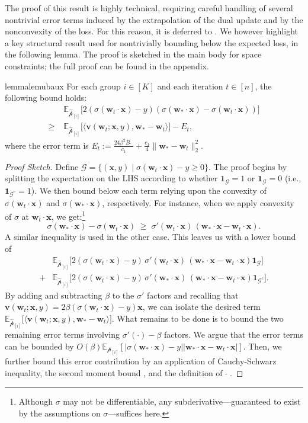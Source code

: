 \documentclass[11pt]{article}
\numberwithin{thm}{section}
\theoremstyle{plain}
\theoremstyle{definition}
\theoremstyle{remark} \newtheorem{remark}[thm]{Remark}
\def\1{\bm{1}}
\def\vv{{\bm{v}}}
\def\vw{{\bm{w}}}
\def\vx{{\bm{x}}}
\def\ep{\widehat{\mathcal{p}}}
\def\pp{{\mathcal{p}}}
\def\cG{{\mathcal{G}}}
\newcommand{\E}{\mathbb{E}}
\newcommand{\ppi}{{\pp_{[i]}}}
\newcommand{\epi}{\ep_{[i]}}
\DeclareMathOperator{\mOPT}{OPT_m}
\newcommand{\mOPThat}{\widehat{\mOPT}}
\begin{document}
The proof of this result is highly technical, requiring careful handling of several nontrivial error terms induced by the extrapolation of the dual update and by the nonconvexity of the loss. For this reason, it is deferred to . We however highlight a key structural result used for nontrivially bounding below the expected loss, in the following lemma. The proof is sketched in the main body for space constraints; the full proof can be found in the appendix. 

\begin{restatable}[Linearization]{lemma}{lemubaux}\label{lemma:main-auxiliary-main-body}
    For each group $i \in [K]$ and each iteration $t \in [n]$, the following bound holds:
    \begin{align*}
        \;&\E_{\epi}\bigl[2(\sigma(\vw_t\cdot \vx)-y)(\sigma(\vw_*\cdot \vx)-\sigma(\vw_t\cdot \vx))\bigr] \\
        \ge\;& \E_{\epi}\bigl[\langle\vv(\vw_t;\vx,y), \vw_*-\vw_t\rangle\bigr] - E_t,
    \end{align*}
    where the error term is $E_t := \frac{24\beta^2 B\mOPThat}{c_1}+\frac{c_1}{4}\|\vw_*-\vw_t\|_2^2$.
\end{restatable}
\begin{proof}[Proof Sketch] 
Define \(\cG = \{(\vx,y)\mid \sigma(\vw_t\cdot \vx)-y\ge0\}\). 
The proof begins by splitting the expectation on the LHS according to whether $\1_{\cG} = 1$ or $\1_{\cG} =0$ (i.e., $\1_{\cG^c} = 1$).
We then bound below each term relying upon  the convexity of \(\sigma(\vw_t\cdot \vx)\) and \(\sigma(\vw_*\cdot \vx)\), respectively.
For instance, when we apply convexity of $\sigma$ at $\vw_t\cdot\vx$, we get:\footnote{Although $\sigma$ may not be differentiable, any subderivative---guaranteed to exist by the assumptions on $\sigma$---suffices here.}
	\[
	\sigma(\vw_*\!\cdot\vx)-\sigma(\vw_t\!\cdot\vx)
	\;\ge\;
	\sigma'(\vw_t\!\cdot\vx)\,(\vw_*\!\cdot\vx-\vw_t\!\cdot\vx).
	\]
A similar inequality is used in the other case.
This leaves us with a lower bound of 
\begin{align*}
&\E_{\epi}\bigl[2(\sigma(\vw_t\!\cdot\vx)-y)\,\sigma'(\vw_t\!\cdot\vx)\,(\vw_*\!\cdot\vx-\vw_t\!\cdot\vx)\1_{\cG}\bigr]\\
		+
		&\E_{\epi}\bigl[2(\sigma(\vw_t\!\cdot\vx)-y)\,\sigma'(\vw_*\!\cdot\vx)\,(\vw_*\!\cdot\vx-\vw_t\!\cdot\vx)\1_{\cG^c}\bigr]. 
\end{align*}
By adding and subtracting \(\beta\) to the $\sigma'$ factors and recalling that $\vv(\vw_t;\vx,y)=2\beta(\sigma(\vw_t\!\cdot\vx)-y)\vx$, 
we can isolate the desired term $\E_{\epi}\bigl[\langle\vv(\vw_t;\vx,y), \vw_*-\vw_t\rangle\bigr]$. 
What remains to be done is to bound the two remaining error terms involving \(\sigma'(\cdot)-\beta\) factors. We argue that the error terms can be bounded by \(O(\beta)\E_{\ppi}[|\sigma(\vw_*\cdot\vx)-y||\vw_*\cdot\vx-\vw_t\cdot\vx|]\). Then, we further bound this error contribution by an application of Cauchy-Schwarz inequality, the second moment bound , and the definition of $\mOPThat.$
\end{proof}
\end{document}
